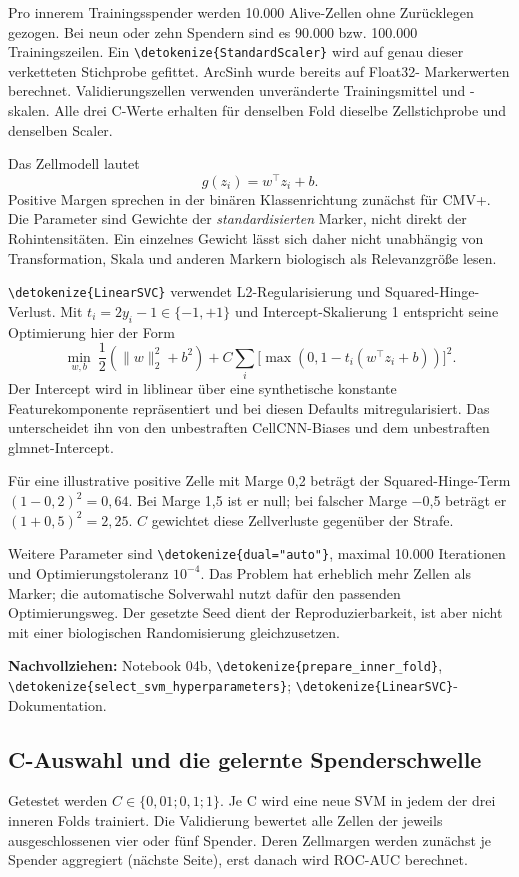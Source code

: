\documentclass[11pt,a4paper]{article}
\newcommand{\code}[1]{\expandafter\nolinkurl\expandafter{\detokenize{#1}}}
\newcommand{\source}[1]{\par{\footnotesize\raggedright\color{muted}\textbf{Nachvollziehen:} #1\par}}
\begin{document}
Pro innerem Trainingsspender werden 10.000 Alive-Zellen ohne Zurücklegen
gezogen. Bei neun oder zehn Spendern sind es 90.000 bzw. 100.000
Trainingszeilen. Ein \code{StandardScaler} wird auf genau dieser
verketteten Stichprobe gefittet. ArcSinh wurde bereits auf Float32-
Markerwerten berechnet. Validierungszellen verwenden unveränderte
Trainingsmittel und -skalen. Alle drei C-Werte erhalten für denselben
Fold dieselbe Zellstichprobe und denselben Scaler.

Das Zellmodell lautet
\[
 g(z_i)=w^\top z_i+b.
\]
Positive Margen sprechen in der binären Klassenrichtung zunächst für
CMV+. Die Parameter sind Gewichte der \emph{standardisierten} Marker,
nicht direkt der Rohintensitäten. Ein einzelnes Gewicht lässt sich daher
nicht unabhängig von Transformation, Skala und anderen Markern biologisch
als Relevanzgröße lesen.

\code{LinearSVC} verwendet L2-Regularisierung und Squared-Hinge-Verlust.
Mit \(t_i=2y_i-1\in\{-1,+1\}\) und Intercept-Skalierung 1 entspricht
seine Optimierung hier der Form
\[
 \min_{w,b}\ \frac12(\|w\|_2^2+b^2)
     +C\sum_i\big[\max(0,1-t_i(w^\top z_i+b))\big]^2.
\]
Der Intercept wird in liblinear über eine synthetische konstante
Featurekomponente repräsentiert und bei diesen Defaults mitregularisiert.
Das unterscheidet ihn von den unbestraften CellCNN-Biases und dem
unbestraften glmnet-Intercept\cite{linearsvc}.

Für eine illustrative positive Zelle mit Marge 0,2 beträgt der
Squared-Hinge-Term \((1-0{,}2)^2=0{,}64\). Bei Marge 1,5 ist er null;
bei falscher Marge −0,5 beträgt er \((1+0{,}5)^2=2{,}25\).
\(C\) gewichtet diese Zellverluste gegenüber der Strafe.

Weitere Parameter sind \code{dual="auto"}, maximal 10.000 Iterationen
und Optimierungstoleranz \(10^{-4}\). Das Problem hat erheblich mehr Zellen
als Marker; die automatische Solverwahl nutzt dafür den passenden
Optimierungsweg. Der gesetzte Seed dient der Reproduzierbarkeit, ist aber
nicht mit einer biologischen Randomisierung gleichzusetzen.
\source{Notebook 04b, \code{prepare_inner_fold},
\code{select_svm_hyperparameters}; \code{LinearSVC}-Dokumentation\cite{linearsvc}.}

\clearpage
\subsection*{C-Auswahl und die gelernte Spenderschwelle}
Getestet werden \(C\in\{0{,}01;0{,}1;1\}\). Je C wird eine neue SVM
in jedem der drei inneren Folds trainiert. Die Validierung bewertet alle
Zellen der jeweils ausgeschlossenen vier oder fünf Spender. Deren
Zellmargen werden zunächst je Spender aggregiert (nächste Seite), erst
danach wird ROC-AUC berechnet.
\end{document}
